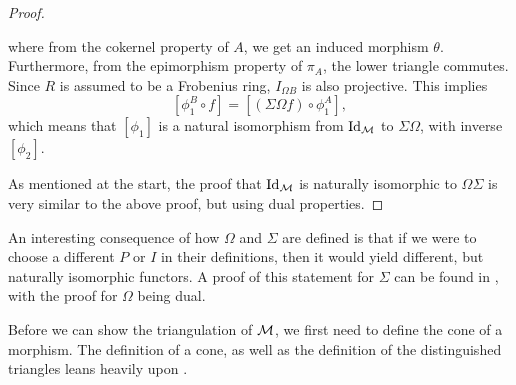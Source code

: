 \begin{proof}
\begin{center}
    \end{center}
    where from the cokernel property of \( A \), we get an induced morphism \( \theta \). Furthermore, from the epimorphism property of \( \pi_A \), the lower triangle commutes. Since \( R \) is assumed to be a Frobenius ring, \( I_{\Omega B} \) is also projective. This implies
    \[
        [\phi_1^B \circ f] = [(\Sigma \Omega f) \circ \phi_1^A],
    \]
    which means that \( [\phi_1] \) is a natural isomorphism from \( \operatorname{Id}_{{\mathcal{M}}} \) to \( \Sigma \Omega \), with inverse \( [\phi_2] \).

    As mentioned at the start, the proof that \( \operatorname{Id}_{{\mathcal{M}}} \) is naturally isomorphic to \( \Omega \Sigma \) is very similar to the above proof, but using dual properties.
\end{proof}

An interesting consequence of how \( \Omega \) and \( \Sigma \) are defined is that if we were to choose a different \( P \) or \( I \) in their definitions, then it would yield different, but naturally isomorphic functors. A proof of this statement for \( \Sigma \) can be found in \cite[p. 13]{Happel_1988}, with the proof for \( \Omega \) being dual.

Before we can show the triangulation of \( {\mathcal{M}} \), we first need to define the cone of a morphism. The definition of a cone, as well as the definition of the distinguished triangles leans heavily upon \cite[Chapter 1, Subsection 2.5]{Happel_1988}.

